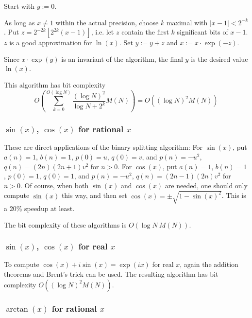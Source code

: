 Start with  \( y:=0 \).

As long as  \( x\neq 1 \) within the actual precision, choose  \( k \)
maximal with  \( |x-1|<2^{-k} \). Put \( z=2^{-2k}\left[ 2^{2k}(x-1)\right]  \),
i.e. let  \( z \) contain the first  \( k \) significant bits of  \( x-1 \).
\( z \) is a good approximation for  \( \ln (x) \). Set  \( y:=y+z \) and
\( x:=x\cdot \exp (-z) \).

Since  \( x\cdot \exp (y) \) is an invariant of the algorithm, the final
\( y \) is the desired value  \( \ln (x) \).

This algorithm has bit complexity
\[ O\left(\sum\limits_{k=0}^{O(\log N)} \frac{(\log N)^2}{\log N + 2^k} M(N)\right)
  = O((\log N)^{2}M(N)) \]


\subsubsection{ \( \sin (x) \),  \( \cos (x) \) for rational  \( x \)}

These are direct applications of the binary splitting algorithm: For
\( \sin (x) \), put  \( a(n)=1 \),  \( b(n)=1 \),  \( p(0)=u \), 
\( q(0)=v \), and  \( p(n)=-u^{2} \),  \( q(n)=(2n)(2n+1)v^{2} \) for
\( n>0 \). For  \( \cos (x) \), put  \( a(n)=1 \),  \( b(n)=1 \),  
\( p(0)=1 \),  \( q(0)=1 \), and  \( p(n)=-u^{2} \),  \( q(n)=(2n-1)(2n)v^{2} \)
for  \( n>0 \). Of course, when both  \( \sin (x) \) and  \( \cos (x) \) are 
needed, one should only compute
 \( \sin (x) \) this way, and then set  
\( \cos (x)=\pm \sqrt{1-\sin (x)^{2}} \). This is a 20\% speedup at least.

The bit complexity of these algorithms is  \( O(\log N\: M(N)) \).


\subsubsection{ \( \sin (x) \),  \( \cos (x) \) for real  \( x \)}

To compute  \( \cos (x)+i\sin (x)=\exp (ix) \) for real  \( x \), again the 
addition theorems and Brent's trick
can be used. The resulting algorithm has bit complexity  
\( O((\log N)^{2}M(N)) \).


\subsubsection{ \( \arctan (x) \) for rational  \( x \)}

